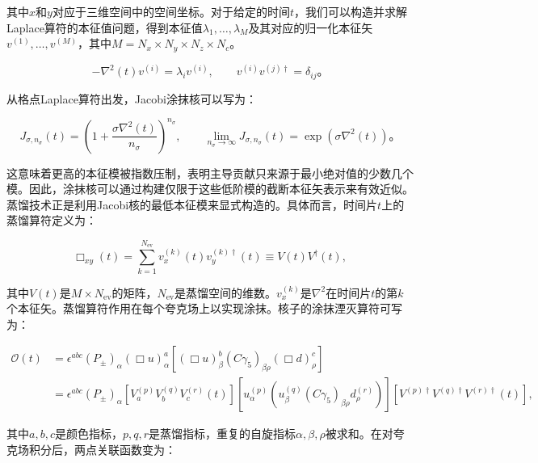 \documentclass[12pt,a4paper]{ctexart}
\theoremstyle{definition}
\begin{document}
其中$x$和$y$对应于三维空间中的空间坐标。对于给定的时间$t$，我们可以构造并求解Laplace算符的本征值问题，得到本征值$\lambda_1, \ldots, \lambda_M$及其对应的归一化本征矢$v^{(1)}, \ldots, v^{(M)}$，其中$M = N_x \times N_y \times N_z \times N_c$。

\begin{equation}
-\nabla^2(t) v^{(i)} = \lambda_i v^{(i)}, \qquad v^{(i)} v^{(j)\dagger} = \delta_{ij}。
\label{eq:eigenvalue}
\end{equation}

从格点Laplace算符出发，Jacobi涂抹核可以写为：

\begin{equation}
J_{\sigma,n_\sigma}(t) = \left(1 + \frac{\sigma\nabla^2(t)}{n_\sigma}\right)^{n_\sigma}, \qquad \lim_{n_\sigma \to \infty} J_{\sigma,n_\sigma}(t) = \exp(\sigma\nabla^2(t))。
\label{eq:jacobi}
\end{equation}

这意味着更高的本征模被指数压制，表明主导贡献只来源于最小绝对值的少数几个模。因此，涂抹核可以通过构建仅限于这些低阶模的截断本征矢表示来有效近似。蒸馏技术\cite{Peardon2009}正是利用Jacobi核的最低本征模来显式构造的。具体而言，时间片$t$上的蒸馏算符定义为：

\begin{equation}
\Box_{xy}(t) = \sum_{k=1}^{N_{\text{ev}}} v^{(k)}_x(t) v^{(k)\dagger}_y(t) \equiv V(t)V^\dagger(t),
\label{eq:distillation}
\end{equation}

其中$V(t)$是$M \times N_{\text{ev}}$的矩阵，$N_{\text{ev}}$是蒸馏空间的维数。$v^{(k)}_x$是$\nabla^2$在时间片$t$的第$k$个本征矢。蒸馏算符作用在每个夸克场上以实现涂抹。核子的涂抹湮灭算符可写为：

\begin{equation}
\begin{aligned}
\mathcal{O}(t) &= \epsilon^{abc} (P_\pm)_\alpha (\Box u)^a_\alpha \left[ (\Box u)^b_\beta (C\gamma_5)_{\beta\rho} (\Box d)^c_\rho \right] \\
&= \epsilon^{abc} (P_\pm)_\alpha \left[V^{(p)}_a V^{(q)}_b V^{(r)}_c (t) \right] \left[ u^{(p)}_\alpha \left( u^{(q)}_\beta (C\gamma_5)_{\beta\rho} d^{(r)}_\rho \right) \right] \left[ V^{(p)\dagger} V^{(q)\dagger} V^{(r)\dagger} (t) \right],
\end{aligned}
\label{eq:nucleon_op}
\end{equation}

其中$a,b,c$是颜色指标，$p,q,r$是蒸馏指标，重复的自旋指标$\alpha,\beta,\rho$被求和。在对夸克场积分后，两点关联函数变为：
\end{document}
